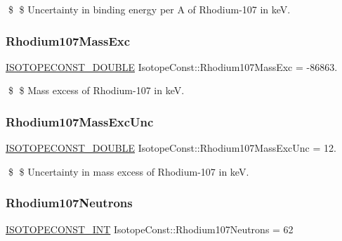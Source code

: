 \$ \$ Uncertainty in binding energy per A of Rhodium-\/107 in keV. \mbox{\label{group___isotope_const-_rhodium-_rh107_ga424996de968fcf56df02de0b78dde620}} 
\subsubsection{\texorpdfstring{Rhodium107\+Mass\+Exc}{Rhodium107MassExc}}
{\footnotesize\ttfamily \mbox{\hyperlink{group___isotope_const-_macros_ga8f45a7272ce02c0b4c65c44636ed719a}{I\+S\+O\+T\+O\+P\+E\+C\+O\+N\+S\+T\+\_\+\+D\+O\+U\+B\+LE}} Isotope\+Const\+::\+Rhodium107\+Mass\+Exc = -\/86863.}

\$ \$ Mass excess of Rhodium-\/107 in keV. \mbox{\label{group___isotope_const-_rhodium-_rh107_ga38846c513362170bde2e39a6ae2036f5}} 
\subsubsection{\texorpdfstring{Rhodium107\+Mass\+Exc\+Unc}{Rhodium107MassExcUnc}}
{\footnotesize\ttfamily \mbox{\hyperlink{group___isotope_const-_macros_ga8f45a7272ce02c0b4c65c44636ed719a}{I\+S\+O\+T\+O\+P\+E\+C\+O\+N\+S\+T\+\_\+\+D\+O\+U\+B\+LE}} Isotope\+Const\+::\+Rhodium107\+Mass\+Exc\+Unc = 12.}

\$ \$ Uncertainty in mass excess of Rhodium-\/107 in keV. \mbox{\label{group___isotope_const-_rhodium-_rh107_gacd4a0722d3f40c8b0d69b9a10f0025ef}} 
\subsubsection{\texorpdfstring{Rhodium107\+Neutrons}{Rhodium107Neutrons}}
{\footnotesize\ttfamily \mbox{\hyperlink{group___isotope_const-_macros_ga5f18360b3e99483a35c32d789e62621c}{I\+S\+O\+T\+O\+P\+E\+C\+O\+N\+S\+T\+\_\+\+I\+NT}} Isotope\+Const\+::\+Rhodium107\+Neutrons = 62}

